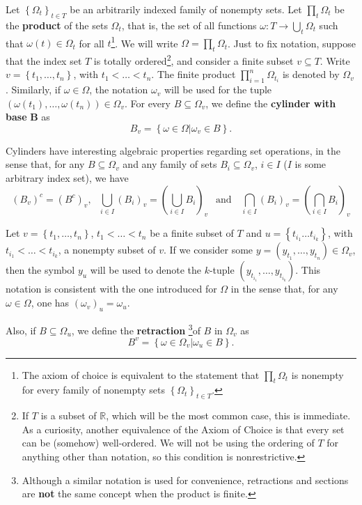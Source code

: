 \begin{defn}\label{definition:infinite product}
		Let \(\left\{\Omega_t\right\}_{t\in T}\) be an
		arbitrarily indexed family of nonempty sets. Let \(\prod_t\Omega_t\) be
		the \textbf{product} of the sets \(\Omega_t\), that is, the set of all
		functions \(\omega\colon T\to \bigcup_{t}\Omega_t\) such that
		\(\omega(t)\in\Omega_t\) for all \(t\)\footnote{The axiom of choice is
		equivalent to the statement that \(\prod_t\Omega_t\) is nonempty for
		every family of nonempty sets \(\left\{\Omega_t\right\}_{t\in T}\).}. We will write \(\Omega=\prod_{t}\Omega_t\). Just to fix notation, suppose that the index set \(T\) is totally ordered\footnote{If \(T\) is a subset of \(\mathbb{R}\), which will be the most common case, this is immediate. As a curiosity, another equivalence of the Axiom of Choice is that every set can be (somehow) well-ordered. We will not be using the ordering of \(T\) for anything other than notation, so this condition is nonrestrictive.}, and consider a finite subset \(v\subseteq T\). Write \(v=\left\{t_1,\dots,t_n\right\}\), with \(t_1<\dots<t_n\). The finite product  \(\prod_{i=1}^n\Omega_{t_i}\) is denoted by \(\Omega_v\). Similarly, if \(\omega\in\Omega\), the notation \(\omega_v\) will be used for the tuple \(\left(\omega(t_{1}), \dots , \omega(t_{n})\right)\in\Omega_v\). For every	\(B\subseteq\Omega_v\), we define the \textbf{cylinder
		with base }\(\pmb{B}\) as 
\[
		B_v=\left\{\omega\in\Omega|\omega_v\in B\right\}
.\]
\end{defn}
\begin{remk}\label{remark:algebraic propertis of cylinders}
		Cylinders have interesting algebraic properties regarding set operations, in the sense that, for any \(B\subseteq\Omega_v\) and any family of sets \(B_i\subseteq\Omega_v\), \(i\in I\) (\(I\) is some arbitrary index set), we have
		\[
				\left(B_v\right)^c=\left(B^c\right)_v,~~~\bigcup_{i\in I}\left(B_i\right)_v=\left(\bigcup_{i\in I}B_i\right)_v~~\text{ and }~~~\bigcap_{i\in I}\left(B_i\right)_v=\left(\bigcap_{i\in I}B_i\right)_v
		\]
\end{remk}
\begin{defn}
		Let \(v=\left\{t_1,\dots,t_n\right\}\), \(t_1<\dots<t_n\) be a finite subset of \(T\) and \(u=\left\{t_{i_{1}} \dots  t_{i_{k}}\right\}\), with \(t_{i_1}<\dots<t_{i_k}\), a nonempty subset of \(v\). If we consider some \(y=\left(y_{t_{1}}, \dots , y_{t_{n}}\right)\in\Omega_v\), then the symbol \(y_u\) will be used to denote the \(k\)-tuple \((y_{t_{i_1}},\dots,y_{t_{i_k}})\). This notation is consistent with the one introduced for \(\Omega\) in the sense that, for any \(\omega\in\Omega\), one has \(\left(\omega_v\right)_u=\omega_u\).

		Also, if \(B\subseteq \Omega_u\), we define the \textbf{retraction} \footnote{Although a similar notation is used for convenience, retractions and sections are \textbf{not} the same concept when the product is finite.}of \(B\) in \(\Omega_{v}\) as
\[
		B^v=\left\{\omega\in\Omega_{v}\left|\omega_u\in B\right.\right\}
.\]
\end{defn}
